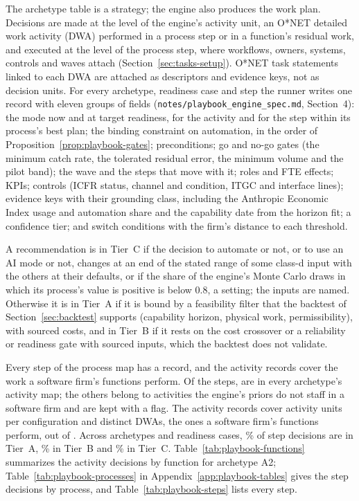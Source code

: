 The archetype table is a strategy; the engine also produces the work plan. Decisions are made at the level of the engine's activity unit, an O*NET detailed work activity (DWA) performed in a process step or in a function's residual work, and executed at the level of the process step, where workflows, owners, systems, controls and waves attach (Section~\ref{sec:tasks-setup}). O*NET task statements linked to each DWA are attached as descriptors and evidence keys, not as decision units. For every archetype, readiness case and step the runner writes one record with eleven groups of fields (\texttt{notes/playbook\_engine\_spec.md}, Section~4): the mode now and at target readiness, for the activity and for the step within its process's best plan; the binding constraint on automation, in the order of Proposition~\ref{prop:playbook-gates}; preconditions; go and no-go gates (the minimum catch rate, the tolerated residual error, the minimum volume and the pilot band); the wave and the steps that move with it; roles and FTE effects; KPIs; controls (ICFR status, channel and condition, ITGC and interface lines); evidence keys with their grounding class, including the Anthropic Economic Index usage and automation share and the capability date from the horizon fit; a confidence tier; and switch conditions with the firm's distance to each threshold.

\begin{definition}\label{def:playbook-tier}
A recommendation is in Tier~C if the decision to automate or not, or to use an AI mode or not, changes at an end of the stated range of some class-d input with the others at their defaults, or if the share of the engine's Monte Carlo draws in which its process's value is positive is below 0.8, a setting; the inputs are named. Otherwise it is in Tier~A if it is bound by a feasibility filter that the backtest of Section~\ref{sec:backtest} supports (capability horizon, physical work, permissibility), with sourced costs, and in Tier~B if it rests on the cost crossover or a reliability or readiness gate with sourced inputs, which the backtest does not validate.
\end{definition}

Every step of the process map has a record, and the activity records cover the work a software firm's functions perform. Of the \pbCovSteps{} steps, \pbCovStepsPop{} are in every archetype's activity map; the others belong to activities the engine's priors do not staff in a software firm and are kept with a flag. The activity records cover \pbCovUnits{} activity units per configuration and \pbCovDWA{} distinct DWAs, the ones a software firm's functions perform, out of \pbCovDWAAll. Across archetypes and readiness cases, \pbTierStepA\% of step decisions are in Tier~A, \pbTierStepB\% in Tier~B and \pbTierStepC\% in Tier~C. Table~\ref{tab:playbook-functions} summarizes the activity decisions by function for archetype A2; Table~\ref{tab:playbook-processes} in Appendix~\ref{app:playbook-tables} gives the step decisions by process, and Table~\ref{tab:playbook-steps} lists every step.

